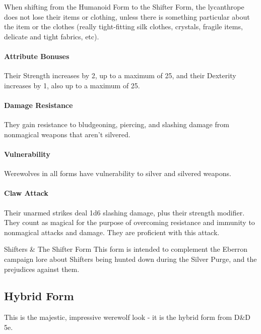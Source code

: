 \documentclass[twocolumn]{dndbook}
\begin{document}
When shifting from the Humanoid Form to the Shifter Form, the lycanthrope does not lose their items or clothing, unless there is something particular about the item or the clothes (really tight-fitting silk clothes, crystals, fragile items, delicate and tight fabrics, etc).

\paragraph*{Attribute Bonuses} Their Strength increases by 2, up to a maximum of 25, and their Dexterity increases by 1, also up to a maximum of 25.
\paragraph*{Damage Resistance} They gain resistance to bludgeoning, piercing, and slashing damage from nonmagical weapons that aren't silvered.
\paragraph*{Vulnerability} Werewolves in all forms have vulnerability to silver and silvered weapons.
\paragraph*{Claw Attack} Their unarmed strikes deal 1d6 slashing damage, plus their strength modifier. They count as magical for the purpose of overcoming resistance and immunity to nonmagical attacks and damage. They are proficient with this attack.


\begin{DndSidebar}[float=!b]{Shifters \& The Shifter Form}
    This form is intended to complement the Eberron campaign lore about Shifters being hunted down during the Silver Purge, and the prejudices against them.
\end{DndSidebar}

\subsection*{Hybrid Form}\label{sec:hybrid-form}
This is the majestic, impressive werewolf look - it is the hybrid form from D\&D 5e.
\end{document}
